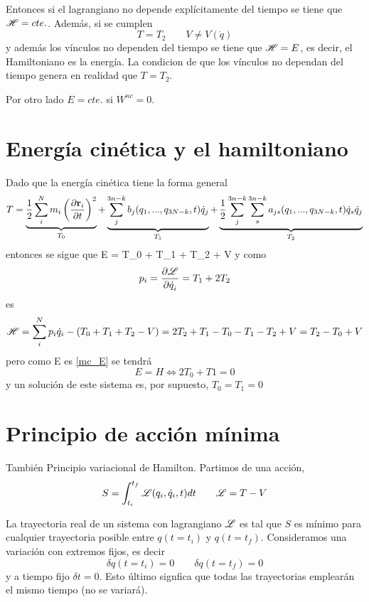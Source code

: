 \documentclass[10pt,oneside]{CBFT_article}
\begin{document}
Entonces si el lagrangiano no depende explícitamente del tiempo se tiene que $\mathscr{H} = cte.$. Además,
si se cumplen 
\[
T=T_2 \qquad V \neq V(\dot{q})
\]
y además los vínculos no dependen del tiempo se tiene que $\mathscr{H}=E$, es decir, el Hamiltoniano es la
energía. La condicion de que los vínculos no dependan del tiempo genera en realidad que $T=T_2$.

Por otro lado $E = cte.$ si $W^{nc} = 0$.

\section{Energía cinética y el hamiltoniano}

Dado que la energía cinética tiene la forma general
\[
T = \underbrace{\frac{1}{2} \sum_i^N m_i \left( \dpar{\vb{r}_i}{t} \right)^2}_{T_0}  +
\underbrace{\sum_j^{3n-k} b_j(q_1,...,q_{3N-k},t)\dot{q}_j  }_{T_1} +
\underbrace{\frac{1}{2} \sum_j^{3n-k}\sum_s^{3n-k}  a_{js}(q_1,...,q_{3N-k},t)\dot{q}_s\dot{q}_j }_{T_2}
\]
entonces se sigue que 
\be
E = T_0 + T_1 + T_2 + V
\label{mc_E}
\ee
y como 
\[
p_i = \frac{\partial^{\hspace{-0.05em}} {\mathscr{L}}}{\partial {\dot{q}_i}^{\hspace{-0.05em}}} = T_1 + 2T_2 
\]
es 
\[
\mathscr{H} = \sum_i^N p_i\dot{q}_i - (T_0 + T_1 + T_2 - V) = 2T_2 + T_1 - T_0 - T_1 - T_2 + V = T_2 - T_0 + V
\]
pero como E es \eqref{mc_E} se tendrá 
\[
E = H \iff 2T_0 + T1 = 0
\]
y un solución de este sistema es, por supuesto, $T_0 = T_1 = 0$

\section{Principio de acción mínima}

También Principio variacional de Hamilton. Partimos de una acción,
\[
S = \int_{t_i}^{t_f} \mathscr{L}( q_i, \dot{q}_i, t ) dt \qquad \mathscr{L} = T-V
\]

La trayectoria real de un sistema con lagrangiano $\mathscr{L}$ es tal que $S$ es mínimo para cualquier 
trayectoria posible entre $q(t=t_i)$ y $q(t=t_f)$. Consideramos una variación con extremos fijos,
es decir 
\[
\delta q(t=t_i) = 0 \qquad \delta q(t=t_f) = 0
\]
y a tiempo fijo $\delta t = 0$. Esto último signfica que todas las trayectorias emplearán el 
mismo tiempo (no se variará).
\end{document}
